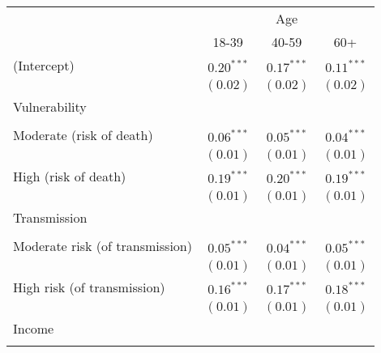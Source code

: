 
\begin{table}
\begin{center}
\begin{scriptsize}
\begin{tabular}{l c c c}
\hline
 & \multicolumn{3}{c}{Age} \\
\cline{2-4}
 & 18-39 & 40-59 & 60+ \\
\hline
(Intercept)                                     & $0.20^{***}$  & $0.17^{***}$  & $0.11^{***}$  \\
                                                & $(0.02)$      & $(0.02)$      & $(0.02)$      \\
Vulnerability                                   &               &               &               \\
                                                &               &               &               \\
\quad Moderate (risk of death)                  & $0.06^{***}$  & $0.05^{***}$  & $0.04^{***}$  \\
                                                & $(0.01)$      & $(0.01)$      & $(0.01)$      \\
\quad High (risk of death)                      & $0.19^{***}$  & $0.20^{***}$  & $0.19^{***}$  \\
                                                & $(0.01)$      & $(0.01)$      & $(0.01)$      \\
Transmission                                    &               &               &               \\
                                                &               &               &               \\
\quad Moderate risk (of transmission)           & $0.05^{***}$  & $0.04^{***}$  & $0.05^{***}$  \\
                                                & $(0.01)$      & $(0.01)$      & $(0.01)$      \\
\quad High risk (of transmission)               & $0.16^{***}$  & $0.17^{***}$  & $0.18^{***}$  \\
                                                & $(0.01)$      & $(0.01)$      & $(0.01)$      \\
Income                                          &               &               &               \\
                                                &               &               &               \\

\end{tabular}
\end{scriptsize}
\end{center}
\end{table}
